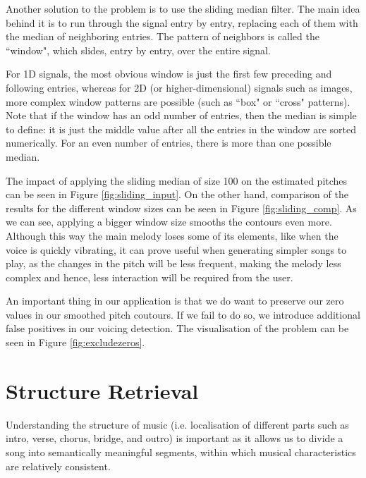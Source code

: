 Another solution to the problem is to use the sliding median filter. The main idea behind it is to run through the signal entry by entry, replacing each of them with the median of neighboring entries. The pattern of neighbors is called the ``window", which slides, entry by entry, over the entire signal. 

For 1D signals, the most obvious window is just the first few preceding and following entries, whereas for 2D (or higher-dimensional) signals such as images, more complex window patterns are possible (such as ``box" or ``cross" patterns). Note that if the window has an odd number of entries, then the median is simple to define: it is just the middle value after all the entries in the window are sorted numerically. For an even number of entries, there is more than one possible median.

The impact of applying the sliding median of size 100 on the estimated pitches can be seen in Figure \ref{fig:sliding_input}. On the other hand, comparison of the results for the different window sizes can be seen in Figure \ref{fig:sliding_comp}. As we can see, applying a bigger window size smooths the contours even more. Although this way the main melody loses some of its elements, like when the voice is quickly vibrating, it can prove useful when generating simpler songs to play, as the changes in the pitch will be less frequent, making the melody less complex and hence, less interaction will be required from the user. 

An important thing in our application is that we do want to preserve our zero values in our smoothed pitch coutours. If we fail to do so, we introduce additional false positives in our voicing detection. The visualisation of the problem can be seen in Figure \ref{fig:excludezeros}.

\vspace{20pt}


\section{Structure Retrieval}

Understanding the structure of music (i.e. localisation of different parts such as intro, verse, chorus, bridge, and outro) is important as it allows us to divide a song into semantically meaningful segments, within which musical characteristics are relatively consistent.

\vspace{10pt}


